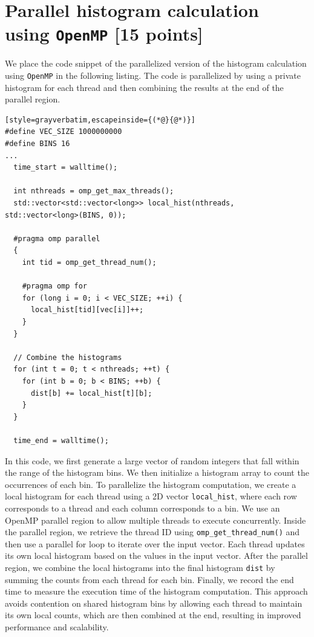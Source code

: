 \documentclass[unicode,10pt,a4paper,oneside,numbers=endperiod,openany]{scrartcl}
\begin{document}
\section{Parallel histogram calculation using \texttt{OpenMP} [15 points]}
We place the code snippet of the parallelized version of the histogram calculation using \texttt{OpenMP} in the following listing. The code is parallelized by using a private histogram for each thread and then combining the results at the end of the parallel region.
\begin{lstlisting}[style=grayverbatim,escapeinside={(*@}{@*)}]
#define VEC_SIZE 1000000000
#define BINS 16
...
  time_start = walltime();

  int nthreads = omp_get_max_threads();
  std::vector<std::vector<long>> local_hist(nthreads, std::vector<long>(BINS, 0));

  #pragma omp parallel
  {
    int tid = omp_get_thread_num();

    #pragma omp for
    for (long i = 0; i < VEC_SIZE; ++i) {
      local_hist[tid][vec[i]]++;
    }
  }

  // Combine the histograms
  for (int t = 0; t < nthreads; ++t) {
    for (int b = 0; b < BINS; ++b) {
      dist[b] += local_hist[t][b];
    }
  }

  time_end = walltime();
\end{lstlisting}
In this code, we first generate a large vector of random integers that fall within the range of the histogram bins. We then initialize a histogram array to count the occurrences of each bin. To parallelize the histogram computation, we create a local histogram for each thread using a 2D vector \texttt{local\_hist}, where each row corresponds to a thread and each column corresponds to a bin. We use an OpenMP parallel region to allow multiple threads to execute concurrently. Inside the parallel region, we retrieve the thread ID using \texttt{omp\_get\_thread\_num()} and then use a parallel for loop to iterate over the input vector. Each thread updates its own local histogram based on the values in the input vector. After the parallel region, we combine the local histograms into the final histogram \texttt{dist} by summing the counts from each thread for each bin. Finally, we record the end time to measure the execution time of the histogram computation. This approach avoids contention on shared histogram bins by allowing each thread to maintain its own local counts, which are then combined at the end, resulting in improved performance and scalability.\\
\end{document}
